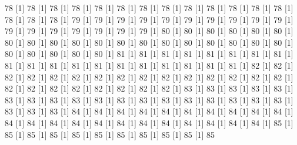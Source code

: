 \documentclass[12pt]{article}
\begin{document}
\begin{Schunk}
\begin{Soutput}
[1] 78%
[1] 78%
[1] 78%
[1] 78%
[1] 78%
[1] 78%
[1] 78%
[1] 78%
[1] 78%
[1] 78%
[1] 78%
[1] 78%
[1] 78%
[1] 78%
[1] 78%
[1] 78%
[1] 79%
[1] 79%
[1] 79%
[1] 79%
[1] 79%
[1] 79%
[1] 79%
[1] 79%
[1] 79%
[1] 79%
[1] 79%
[1] 79%
[1] 79%
[1] 79%
[1] 79%
[1] 79%
[1] 79%
[1] 80%
[1] 80%
[1] 80%
[1] 80%
[1] 80%
[1] 80%
[1] 80%
[1] 80%
[1] 80%
[1] 80%
[1] 80%
[1] 80%
[1] 80%
[1] 80%
[1] 80%
[1] 80%
[1] 80%
[1] 80%
[1] 80%
[1] 80%
[1] 80%
[1] 80%
[1] 80%
[1] 80%
[1] 81%
[1] 81%
[1] 81%
[1] 81%
[1] 81%
[1] 81%
[1] 81%
[1] 81%
[1] 81%
[1] 81%
[1] 81%
[1] 81%
[1] 81%
[1] 81%
[1] 81%
[1] 81%
[1] 81%
[1] 81%
[1] 81%
[1] 82%
[1] 82%
[1] 82%
[1] 82%
[1] 82%
[1] 82%
[1] 82%
[1] 82%
[1] 82%
[1] 82%
[1] 82%
[1] 82%
[1] 82%
[1] 82%
[1] 82%
[1] 82%
[1] 82%
[1] 82%
[1] 82%
[1] 82%
[1] 82%
[1] 82%
[1] 82%
[1] 83%
[1] 83%
[1] 83%
[1] 83%
[1] 83%
[1] 83%
[1] 83%
[1] 83%
[1] 83%
[1] 83%
[1] 83%
[1] 83%
[1] 83%
[1] 83%
[1] 83%
[1] 83%
[1] 83%
[1] 83%
[1] 83%
[1] 83%
[1] 83%
[1] 84%
[1] 84%
[1] 84%
[1] 84%
[1] 84%
[1] 84%
[1] 84%
[1] 84%
[1] 84%
[1] 84%
[1] 84%
[1] 84%
[1] 84%
[1] 84%
[1] 84%
[1] 84%
[1] 84%
[1] 84%
[1] 84%
[1] 84%
[1] 84%
[1] 84%
[1] 85%
[1] 85%
[1] 85%
[1] 85%
[1] 85%
[1] 85%
[1] 85%
[1] 85%
[1] 85%
[1] 85%
[1] 85%

\end{Soutput}
\end{Schunk}
\end{document}
